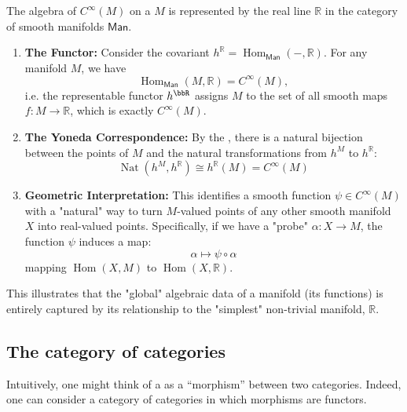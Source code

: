 \begin{example} 
The algebra of  $C^\infty(M)$ on a  $M$ is represented by the real line $\mathbb{R}$ in the category of smooth manifolds $\mathsf{Man}$.
\begin{enumerate}
    \item \textbf{The Functor:} Consider the covariant  $h^{\mathbb{R}} = \operatorname{Hom}_{\mathsf{Man}}(-, \mathbb{R})$. For any manifold $M$, we have 
    $$\operatorname{Hom}_{\mathsf{Man}}(M, \mathbb{R}) = C^\infty(M),$$ 
    i.e. the representable functor $h^{\bbR}$ assigns $M$ to the set of all smooth maps $f: M \to \mathbb{R}$, which is exactly $C^\infty(M)$.
    
    \item \textbf{The Yoneda Correspondence:} By the , there is a natural bijection between the points of $M$ and the natural transformations from $h^M$ to $h^{\mathbb{R}}$:
    \[ \operatorname{Nat}(h^M, h^{\mathbb{R}}) \cong h^{\mathbb{R}}(M) = C^\infty(M) \]
    
    \item \textbf{Geometric Interpretation:} This identifies a smooth function $\psi \in C^\infty(M)$ with a "natural" way to turn $M$-valued points of any other smooth manifold $X$ into real-valued points. Specifically, if we have a "probe" $\alpha: X \to M$, the function $\psi$ induces a map:
    \[ \alpha \mapsto \psi \circ \alpha \]
    mapping $\operatorname{Hom}(X, M)$ to $\operatorname{Hom}(X, \mathbb{R})$.
\end{enumerate}
This illustrates that the "global" algebraic data of a manifold (its functions) is entirely captured by its relationship to the "simplest" non-trivial manifold, $\mathbb{R}$.
\end{example}


\subsection{The category of categories}

Intuitively, one might think of a  as a ``morphism'' between two categories. Indeed, one can consider a category of categories in which morphisms are functors.

